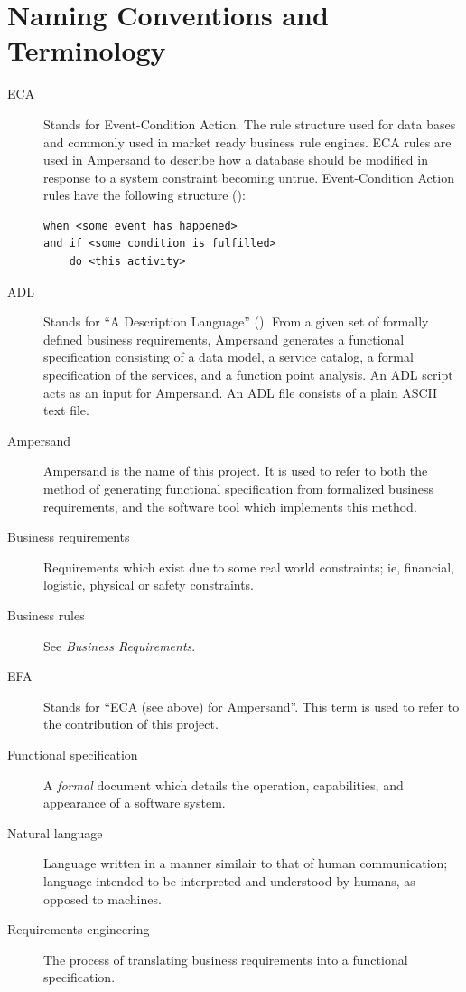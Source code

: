 \documentclass[12pt]{report}
\begin{document}
\section{Naming Conventions and Terminology}\label{sec:Naming} 
\begin{description}
\item[ECA] Stands for Event-Condition Action. The rule structure used for data
  bases and commonly used in market ready business rule engines. ECA rules are
  used in Ampersand to describe how a database should be modified in response to
  a system constraint becoming untrue. Event-Condition Action rules have
  the following structure (\cite[8--9]{RBD}):
\begin{verbatim}
when <some event has happened> 
and if <some condition is fulfilled> 
    do <this activity>
\end{verbatim} %
\item [ADL] Stands for ``A Description Language'' (\cite[13]{derFun}). From a
given set of formally defined business requirements, Ampersand generates a
functional specification consisting of a data model, a service catalog, a
formal specification of the services, and a function point analysis. An ADL
script acts as an input for Ampersand. An ADL file consists of a plain ASCII
text file.
\item [Ampersand] Ampersand is the name of this project. It is used to refer to
both the method of generating functional specification from formalized
business requirements, and the software tool which implements this method.
\item [Business requirements] Requirements which exist due to some real world constraints;
ie, financial, logistic, physical or safety constraints. 
\item [Business rules] See \emph{Business Requirements}.
\item [EFA] Stands for ``ECA (see above) for Ampersand''. This term is used to refer to 
  the contribution of this project. 
\item [Functional specification] A \emph{formal} document which details the operation,
  capabilities, and appearance of a software system. 

\item [Natural language] Language written in a manner similair to that of human communication; 
  language intended to be interpreted and understood by humans, as opposed to machines. 
\item [Requirements engineering] The process of translating business
requirements into a functional specification. 
 


\end{description}
\end{document}
